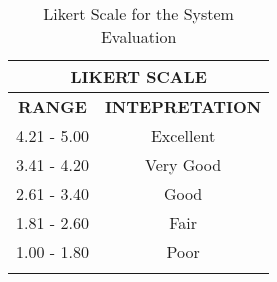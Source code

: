 \begin{longtable}[c]{|c|c|}
\hline
\multicolumn{2}{|c|}{\textbf{LIKERT SCALE}} \\ \hline
\endfirsthead
%
\endhead
%
\textbf{RANGE}   & \textbf{INTEPRETATION}   \\ \hline
4.21 - 5.00      & Excellent                \\ \hline
3.41 - 4.20      & Very Good                \\ \hline
2.61 - 3.40      & Good                     \\ \hline
1.81 - 2.60      & Fair                     \\ \hline
1.00 - 1.80      & Poor                     \\ \hline
\caption{Likert Scale for the System Evaluation}
\label{table:ratings_scale}
\end{longtable}
